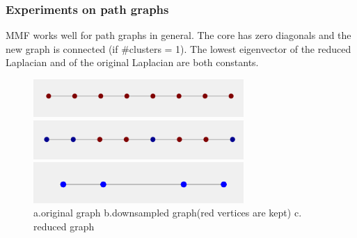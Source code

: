 \documentclass[a4paper]{article}
\begin{document}
\subsubsection{Experiments on path graphs}
MMF works well for path graphs in general. The core has zero diagonals and the new graph is connected (if \#clusters = 1). The lowest eigenvector of the reduced Laplacian and of the original Laplacian are both constants.

\begin{figure}[H]
\centering

\includegraphics[width = 8cm]{path_graph/path_graph}

\includegraphics[width = 8cm]{path_graph/downsample_path_graph}

\includegraphics[width = 8cm]{path_graph/rewire_path_graph}

\caption{a.original graph b.downsampled graph(red vertices are kept) c. reduced graph}
\end{figure}
\end{document}
